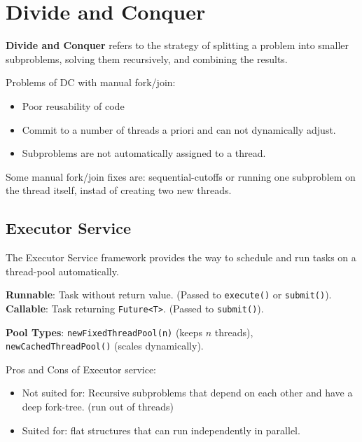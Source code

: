 \section{Divide and Conquer}

\begin{definition}

\textbf{Divide and Conquer } refers to the strategy of splitting a problem into smaller subproblems,
                solving them recursively, and combining the results.
            
\end{definition}

Problems of DC with manual fork/join:
\begin{itemize}
    \item Poor reusability of code
    \item Commit to a number of threads a priori and can not dynamically adjust.
    \item Subproblems are not automatically assigned to a thread.
\end{itemize}


\begin{remark}
Some manual fork/join fixes are: sequential-cutoffs or running one
subproblem on the thread itself, instad of creating two new threads.
\end{remark}

\subsection{Executor Service}

The Executor Service framework provides the way to schedule and run tasks on a thread-pool automatically.

\begin{definition}
\textbf{Runnable}: Task without return value. (Passed to \texttt{execute()} or \texttt{submit()}).
\textbf{Callable}: Task returning \texttt{Future<T>}. (Passed to \texttt{submit()}).
\end{definition}

\begin{remark}
\textbf{Pool Types}: \texttt{newFixedThreadPool(n)} (keeps $n$ threads), \texttt{newCachedThreadPool()} (scales dynamically).
\end{remark}

Pros and Cons of Executor service:
\begin{itemize}
    \item Not suited for: Recursive subproblems that depend on each other and have a deep fork-tree. (run out of threads)
    \item Suited for: flat structures that can run independently in parallel.
\end{itemize}

